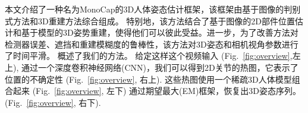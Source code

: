 本文介绍了一种名为MonoCap的3D人体姿态估计框架，该框架由基于图像的判别式方法和3D重建方法综合组成。
特别地，该方法结合了基于图像的2D部件位置估计和基于模型的3D姿势重建，使得他们可以彼此受益。进一步，为了改善方法对检测器误差、遮挡和重建模糊度的鲁棒性，该方法对3D姿态和相机视角参数进行了时间平滑。
 概述了我们的方法。
给定这样这个视频输入 (Fig.\ \ref{fig:overview},左上), 通过一个深度卷积神经网络(CNN)，我们可以得到2D关节的热图，它表示了位置的不确定性 (Fig.\ \ref{fig:overview}, 右上). 这些热图使用一个稀疏3D人体模型组合起来 (Fig.\ \ref{fig:overview}, 左下) 通过期望最大(EM)框架，恢复出3D姿态序列。(Fig.\ \ref{fig:overview}, 右下).

